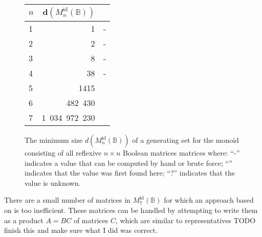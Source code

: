 \documentclass[11pt]{article}
\numberwithin{equation}{section}
\newcommand{\B}{\mathbb{B}}
\newcommand{\Refn}{M_n^{\text{id}}(\B)}
\newcommand{\Ref}[1]{M_{#1}^{\text{id}}(\B)}
\newcommand{\cmark}{\ding{51}}
\begin{document}
\begin{figure}
  \centering
  \begin{tabular}{l|r|r}
    $n$ & $\mathbf{d}(\Refn)$ &   \\
    \hline
    1 & 1          & - \\ 
    2 & 2          & - \\ 
    3 & 8          & - \\ 
    4 & 38         & - \\
    5 & 1415       & \cmark \\
    6 & 482\ 430   & \cmark \\ 
    7 & 1\ 034\ 972\ 230          & \cmark \\
  \end{tabular}
  \caption{The minimum size $d(\Refn)$ of a generating set for the monoid
    consisting of all reflexive $n \times n$ Boolean matrices matrices where:
    ``-'' indicates a value that can be computed by hand or brute force;
    ``\cmark'' indicates that the value was first found here; ``?'' indicates
    that the value is unknown.}
  \label{fig:reflexiverank}
\end{figure}

There are a small number of matrices in $\Ref{7}$ for which an approach based on
 is too inefficient. These matrices can be
handled by attempting to write them as a product $A = BC$ of matrices $C$, which
are similar to representatives TODO finish this and make sure what I did was
correct.
\end{document}
